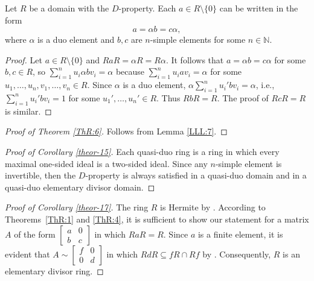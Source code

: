 \documentclass{cimart}
\begin{document}
\begin{lemma}\label{LLL:7}
Let $R$ be a domain  with the $D$-property. Each  $a\in R\setminus\{0\}$ can be written in the form
\[
a=\alpha b=c\alpha,
\]
where $\alpha$ is a duo element and $b,c$  are $n$-simple elements for some  $n\in \mathbb{N}$.
\end{lemma}
\begin{proof}
Let $a\in  R\setminus \{0\}$ and $RaR=\alpha R=R\alpha$. It follows that  $a=\alpha b=c\alpha$ for some $b,c\in R$, so $\sum_{i=1}^nu_i\alpha  b v_i=\alpha$ because  $\sum_{i=1}^nu_iav_i=\alpha$ for some $u_1,\dots, u_n, v_1,\dots, v_n\in R$. Since $\alpha$ is a duo element,  $\alpha\sum_{i=1}^nu_i' b v_i=\alpha$, i.e., $\sum_{i=1}^nu_i' b v_i=1$ for some $u_1', \dots, u_n'\in R$. Thus  $RbR=R$. The proof of $RcR=R$  is similar.
\end{proof}



\begin{proof}[Proof of Theorem \ref{ThR:6}]
Follows from Lemma \ref{LLL:7}.
\end{proof}

\begin{proof}[Proof of Corollary \ref{theor-15}]
Each quasi-duo ring is a ring in which every maximal   one-sided ideal is a two-sided ideal. Since any $n$-simple element is invertible, then the $D$-property is always satisfied  \cite[Theorem~1]{2-zabkom} in a quasi-duo domain and in a quasi-duo elementary divisor domain.
\end{proof}



\begin{proof}[Proof of Corollary \ref{theor-17}]
The ring $R$ is  Hermite by \cite[Theorem 2]{4-zabavsky}.  According to Theorems~\ref{ThR:1} and  \ref{ThR:4},  it is sufficient to show our statement  for  a  matrix $A$ of the form
$\left[\begin{array}{cc}
a& 0 \\
b & c
\end{array}\right]$ in which   $RaR=R$.  Since   $a$ is  a finite element, it is   evident that   $A\sim \left[\begin{array}{cc}
                                                   f& 0 \\
                                                   0 & d
                                                 \end{array}\right]$
in which $RdR\subseteq f R\cap Rf$ by \cite[Theorem 6]{10-zabavsky}. Consequently,  $R$ is an elementary divisor ring.
\end{proof}
\end{document}
